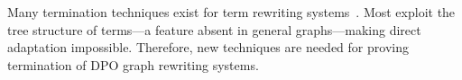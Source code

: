 Many termination techniques exist for term rewriting systems~\cite{nipkow1998term, dershowitz1982orderings, middeldorp1997simple, arts2000termination}.  
Most exploit the tree structure of terms—a feature absent in general graphs—making direct adaptation impossible. 
Therefore, new techniques are needed for proving termination of DPO graph rewriting systems. 


